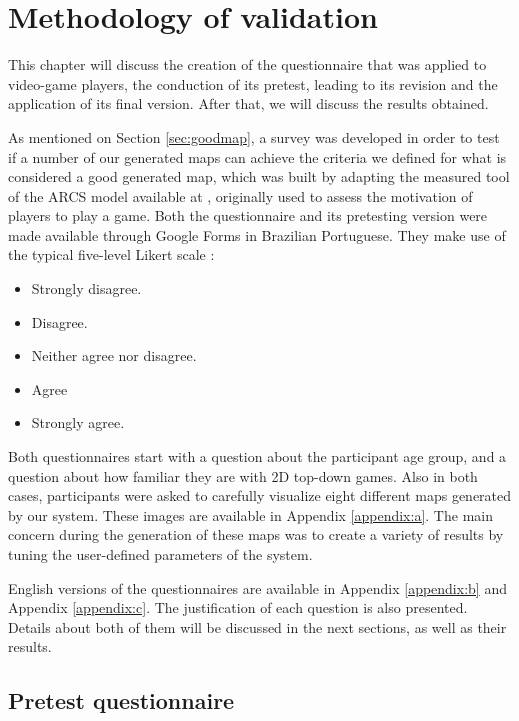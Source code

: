 \chapter{Methodology of validation}
\label{chapter:survey}

This chapter will discuss the creation of the questionnaire that was applied to video-game players, the conduction of its pretest, leading to its revision and the application of its final version. After that, we will discuss the results obtained.

As mentioned on Section \ref{sec:goodmap}, a survey was developed in order to test if a number of our generated maps can achieve the criteria we defined for what is considered a good generated map, which was built by adapting the measured tool of the ARCS model available at \textcite{carvalho:2016}, originally used to assess the motivation of players to play a game. Both the questionnaire and its pretesting version were made available through Google Forms in Brazilian Portuguese. They make use of the typical five-level Likert scale \cite{likert:1932}:
\begin{itemize}
    \item Strongly disagree.
    \item Disagree.
    \item Neither agree nor disagree.
    \item Agree
    \item Strongly agree.
\end{itemize}

Both questionnaires start with a question about the participant age group, and a question about how familiar they are with 2D top-down games. Also in both cases, participants were asked to carefully visualize eight different maps generated by our system. These images are available in Appendix \ref{appendix:a}. The main concern during the generation of these maps was to create a variety of results by tuning the user-defined parameters of the system.

English versions of the questionnaires are available in Appendix \ref{appendix:b} and Appendix \ref{appendix:c}. The justification of each question is also presented. Details about both of them will be discussed in the next sections, as well as their results.
 
\section{Pretest questionnaire}

